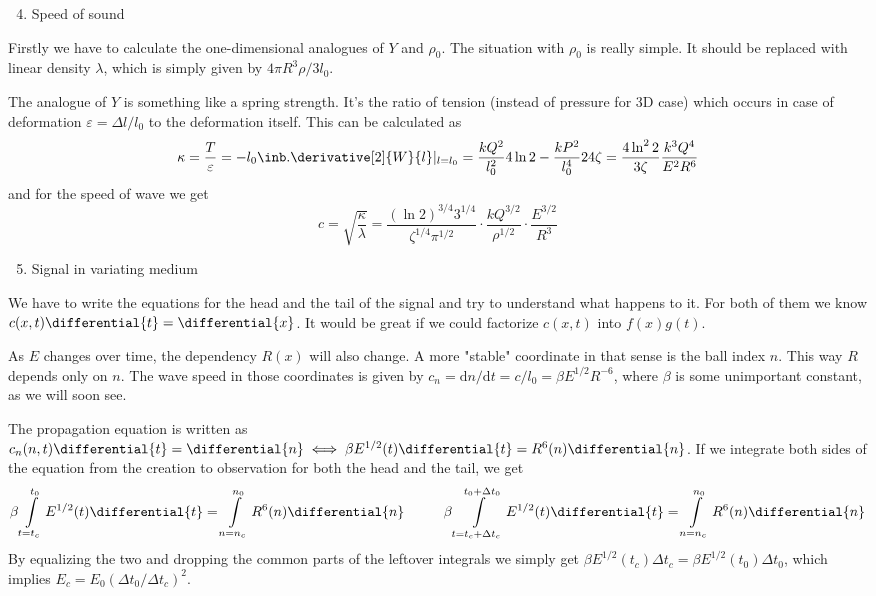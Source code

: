 \begin{enumerate}
    \setcounter{enumi}{3}
    \item Speed of sound
\end{enumerate}

Firstly we have to calculate the one-dimensional analogues of $Y$ and $\rho_0$.
The situation with $\rho_0$ is really simple.
It should be replaced with linear density $\lambda$,
which is simply given by $4\pi R^3 \rho / 3 l_0$.

The analogue of $Y$ is something like a spring strength.
It's the ratio of tension (instead of pressure for 3D case)
which occurs in case of deformation $\varepsilon = \Delta l / l_0$
to the deformation itself.
This can be calculated as
\begin{equation}
    \kappa = \frac{T}{\varepsilon} = -l_0 \inb.{\derivative[2]{W}{l}}|_{l=l_0} =
    \frac{k Q^2}{l_0^2} 4\ln{2} - \frac{k P^2}{l_0^4} 24\zeta =
    \frac{4 \ln^2{2}}{3\zeta} \frac{k^3 Q^4}{E^2 R^6}
\end{equation}
and for the speed of wave we get
\begin{equation}
    c = \sqrt{\frac{\kappa}{\lambda}} =
    \frac{(\ln{2})^{3/4} 3^{1/4}}{\zeta^{1/4} \pi^{1/2}}
    \cdot \frac{k Q^{3/2}}{\rho^{1/2}} \cdot \frac{E^{3/2}}{R^3}
\end{equation} 

\begin{enumerate}
    \setcounter{enumi}{4}
    \item Signal in variating medium
\end{enumerate}

We have to write the equations for the head and the tail of the signal
and try to understand what happens to it.
For both of them we know $c(x, t) \differential{t} = \differential{x}$.
It would be great if we could factorize $c(x, t)$ into $f(x)g(t)$. 

As $E$ changes over time,
the dependency $R(x)$ will also change.
A more "stable" coordinate in that sense is the ball index $n$.
This way $R$ depends only on $n$.
The wave speed in those coordinates is given by
$c_n = \text{d}n / \text{d}t = c / l_0 = \beta E^{1/2} R^{-6}$,
where $\beta$ is some unimportant constant, as we will soon see.

The propagation equation is written as
$c_n(n, t) \differential{t} = \differential{n}
\iff \beta E^{1/2}(t) \differential{t} = R^6(n) \differential{n}$.
If we integrate both sides of the equation
from the creation to observation for both the head and the tail, we get
\begin{equation}
    \beta\int\displaylimits_{t=t_c}^{t_0} E^{1/2}(t) \differential{t} =
    \int\displaylimits_{n=n_c}^{n_0} R^6(n) \differential{n}
    \hspace{1cm}
    \beta\int\displaylimits_{t=t_c+\Delta t_c}^{t_0 + \Delta t_0} E^{1/2}(t) \differential{t} =
    \int\displaylimits_{n=n_c}^{n_0} R^6(n) \differential{n}
\end{equation}
By equalizing the two and dropping the common parts
of the leftover integrals we simply get
$\beta E^{1/2}(t_c) \Delta t_c = \beta E^{1/2}(t_0) \Delta t_0$,
which implies $E_c = E_0 (\Delta t_0 / \Delta t_c)^2$.
